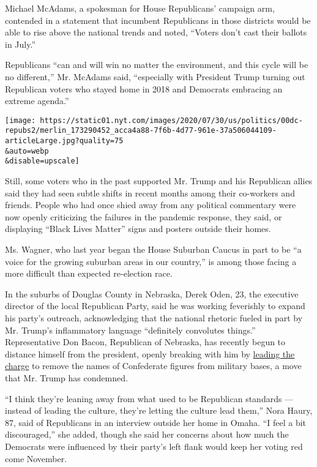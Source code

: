 Michael McAdams, a spokesman for House Republicans' campaign arm,
contended in a statement that incumbent Republicans in those districts
would be able to rise above the national trends and noted, ``Voters
don't cast their ballots in July.''

Republicans ``can and will win no matter the environment, and this cycle
will be no different,'' Mr. McAdams said, ``especially with President
Trump turning out Republican voters who stayed home in 2018 and
Democrats embracing an extreme agenda.''

\texttt{[image: https://static01.nyt.com/images/2020/07/30/us/politics/00dc-repubs2/merlin\_173290452\_acca4a88-7f6b-4d77-961e-37a506044109-articleLarge.jpg?quality=75\\\&auto=webp\\\&disable=upscale]}

Still, some voters who in the past supported Mr. Trump and his
Republican allies said they had seen subtle shifts in recent months
among their co-workers and friends. People who had once shied away from
any political commentary were now openly criticizing the failures in the
pandemic response, they said, or displaying ``Black Lives Matter'' signs
and posters outside their homes.

Ms. Wagner, who last year began the House Suburban Caucus in part to be
``a voice for the growing suburban areas in our country,'' is among
those facing a more difficult than expected re-election race.

In the suburbs of Douglas County in Nebraska, Derek Oden, 23, the
executive director of the local Republican Party, said he was working
feverishly to expand his party's outreach, acknowledging that the
national rhetoric fueled in part by Mr. Trump's inflammatory language
``definitely convolutes things.'' Representative Don Bacon, Republican
of Nebraska, has recently begun to distance himself from the president,
openly breaking with him by
\href{https://www.nytimes.com/2020/07/20/us/politics/congress-trump-confederate-base-names.html}{leading
the charge} to remove the names of Confederate figures from military
bases, a move that Mr. Trump has condemned.

``I think they're leaning away from what used to be Republican standards
--- instead of leading the culture, they're letting the culture lead
them,'' Nora Haury, 87, said of Republicans in an interview outside her
home in Omaha. ``I feel a bit discouraged,'' she added, though she said
her concerns about how much the Democrats were influenced by their
party's left flank would keep her voting red come November.

